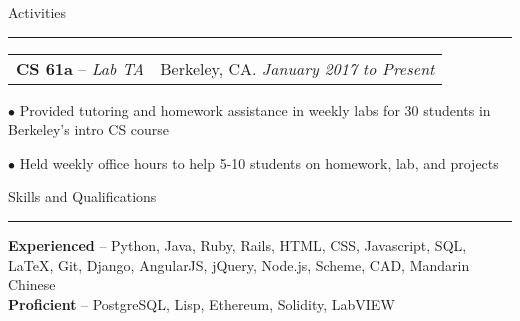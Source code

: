 \documentclass[11pt,letterpaper]{article}
\makeatletter
\newcommand{\bulletpoint}{\rule{0cm}{1pt}$\bullet$  }
\newenvironment{topic}[1]
    {
    \large #1
    \vspace*{0.03in}
    \hrule 
    \vspace*{0.05in}
    }
    {}
\newenvironment{event}
    {
    \begin{tabular*}{\textwidth}{l@{\extracolsep{\fill}}r}
    }
    {
    \end{tabular*}
    }
\newenvironment{detail}
    {
    \normalsize
    }
    {
    \vspace*{0.02in}
    }
\makeatother
\begin{document}
    \begin{topic}{Activities}
        \begin{event}
            \textbf{CS 61a} -- \emph{Lab TA} & Berkeley, CA. \emph{January 2017 to Present}
        \end{event}
            \begin{detail}
                \bulletpoint Provided tutoring and homework assistance in weekly labs for 30 students in Berkeley's intro CS course\\
                \bulletpoint Held weekly office hours to help 5-10 students on homework, lab, and projects
            \end{detail} 
    \end{topic} \vspace*{0.1in}





    \begin{topic}{Skills and Qualifications}
        \begin{detail}
            \textbf{Experienced} -- Python, Java, Ruby, Rails, HTML, CSS, Javascript, SQL, LaTeX, Git, Django, AngularJS, jQuery, Node.js, Scheme, CAD, Mandarin Chinese\\
            \textbf{Proficient} -- PostgreSQL, Lisp, Ethereum, Solidity, LabVIEW
        \end{detail}
    \end{topic}

\end{document}

